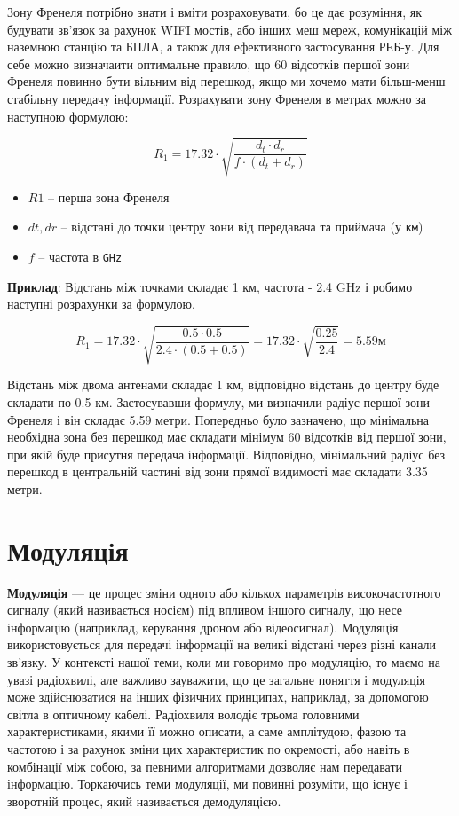 \documentclass{article}
\begin{document}
Зону Френеля потрібно знати і вміти розраховувати, бо це дає розуміння, як будувати зв'язок за рахунок WIFI мостів, або інших меш мереж, комунікацій між наземною станцію та БПЛА, а також для ефективного застосування РЕБ-у. Для себе можно визначаити оптимальне правило, що 60 відсотків першої зони Френеля повинно бути вільним від перешкод, якщо ми хочемо мати більш-менш стабільну передачу інформації. Розрахувати зону Френеля в метрах можно за наступною формулою:


\[
R_1 = 17.32 \cdot \sqrt{\frac{d_t \cdot d_r}{f \cdot (d_t + d_r)}}
\]

\begin{itemize}[noitemsep, topsep=8pt]
	\item $R1$ -- перша зона Френеля
	\item $dt,dr$ -- відстані до точки центру зони від передавача та приймача (у \texttt{км})
	\item ${f}$ -- частота в \texttt{GHz}
\end{itemize}

\textbf{Приклад}: Відстань між точками складає 1 км, частота - 2.4 GHz і робимо наступні розрахунки за формулою.

\[
R_1 = 17.32 \cdot \sqrt{\frac{0.5 \cdot 0.5}{2.4 \cdot (0.5 + 0.5)}}=17.32 \cdot \sqrt {\frac{0.25}{2.4}}=5.59 м
\]

Відстань між двома антенами складає 1 км, відповідно відстань до центру буде складати по 0.5 км. Застосувавши формулу, ми визначили радіус першої зони Френеля і він складає 5.59 метри. Попередньо було зазначено, що мінімальна необхідна зона без перешкод має складати мінімум 60 відсотків від першої зони, при якій буде присутня передача інформації. Відповідно, мінімальний радіус без перешкод в центральній частині від зони прямої видимості має складати 3.35 метри.


\section{Модуляція}
\label{sec:modulation}

\textbf{Модуляція} --- це процес зміни одного або кількох параметрів високочастотного сигналу (який називається носієм) під впливом іншого сигналу, що несе інформацію (наприклад, керування дроном або відеосигнал). Модуляція використовується для передачі інформації на великі відстані через різні канали зв'язку. У контексті нашої теми, коли ми говоримо про модуляцію, то маємо на увазі радіохвилі, але важливо зауважити, що це загальне поняття і модуляція може здійснюватися на інших фізичних принципах, наприклад, за допомогою світла в оптичному кабелі. Радіохвиля володіє трьома головними характеристиками, якими її можно описати, а саме амплітудою, фазою та частотою і за рахунок зміни цих характеристик по окремості, або навіть в комбінації між собою, за певними алгоритмами дозволяє нам передавати інформацію. Торкаючись теми модуляції, ми повинні розуміти, що існує і зворотній процес, який називається демодуляцією. 
\end{document}
